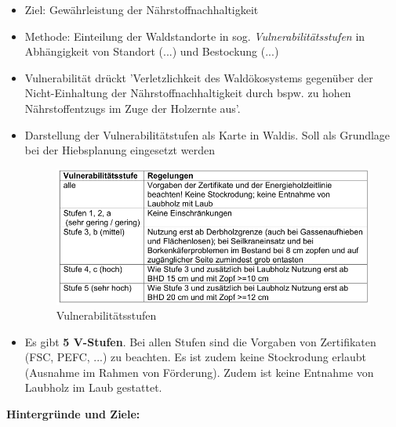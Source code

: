 \documentclass{article}
\begin{document}
\begin{itemize}
	
	\item Ziel: Gewährleistung der Nährstoffnachhaltigkeit
	
	\item Methode: Einteilung der Waldstandorte in sog. \textit{Vulnerabilitätsstufen} in Abhängigkeit von Standort (...) und Bestockung (...)
	
	\item Vulnerabilität drückt 'Verletzlichkeit des Waldökosystems gegenüber der Nicht-Einhaltung der Nährstoffnachhaltigkeit durch bspw. zu hohen Nährstoffentzugs im Zuge der Holzernte aus'.
	
	\item Darstellung der Vulnerabilitätstufen als Karte in Waldis. Soll als Grundlage bei der Hiebsplanung eingesetzt werden
	
	\begin{figure}[h]
		\centering
		\includegraphics[scale=0.6]{Vulnerastufen.PNG}
		\caption{Vulnerabilitätsstufen}
		\label{fig:vulstufen}
	\end{figure}
	
	\item Es gibt \textbf{5 V-Stufen}. Bei allen Stufen sind die Vorgaben von Zertifikaten (FSC, PEFC, ...) zu beachten. Es ist zudem keine Stockrodung erlaubt (Ausnahme im Rahmen von Förderung). Zudem ist keine Entnahme von Laubholz im Laub gestattet.
		
\end{itemize} 

\textbf{Hintergründe und Ziele:}\\
\end{document}
